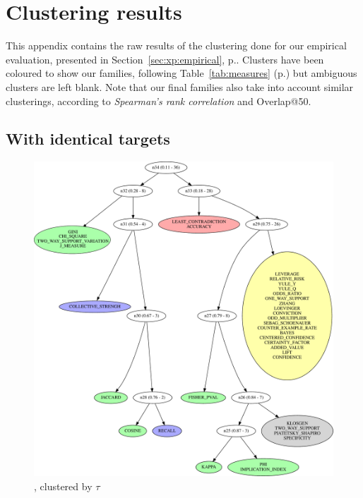 \chapter{Clustering results}
\label{sec:capa:clusters}

This appendix contains the raw results of the clustering done for our empirical evaluation,
presented in Section~\ref{sec:xp:empirical}, p.\pageref{sec:xp:empirical}.
Clusters have been coloured to show our families, following Table~\ref{tab:measures} (p.\pageref{tab:measures})
but ambiguous clusters are left blank.
Note that our final families also take into account similar clusterings,
according to {\em Spearman's rank correlation} and Overlap@50.

\vfill
\pagebreak

\section{With identical targets}
\label{sec:capa:clusters:identicaltargets}


\begin{figure}[th!]
  \begin{center}
  \includegraphics[width=\textwidth]{svg/rankingcom/patterns_demo-perTarget-KENDAL.pdf}
  \caption{\demoassoc, clustered by $\tau$}
  \end{center}
\end{figure}


